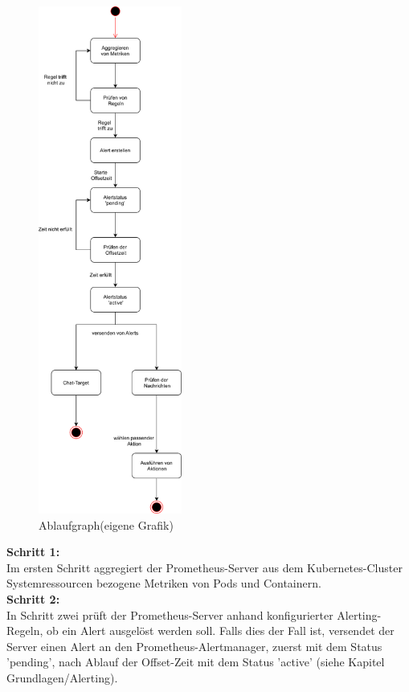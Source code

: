 \documentclass[a4paper,10pt]{scrartcl}
\begin{document}
\pagebreak

\begin{figure}

\begin{center}
  \includegraphics[width=0.42\textwidth,height=1.32\textwidth]{img/AAMtextless.PNG}
  \caption{Ablaufgraph(eigene Grafik)}
\end{center}

\end{figure}
\textbf{Schritt 1:}\\
Im ersten Schritt aggregiert der Prometheus-Server
aus dem Kubernetes-Cluster Systemressourcen bezogene Metriken
von Pods und Containern.\\

\textbf{Schritt 2:}\\
In Schritt zwei prüft der Prometheus-Server anhand konfigurierter Alerting-Regeln,
ob ein Alert ausgelöst werden soll. Falls dies der Fall ist,
versendet der Server einen Alert an den Prometheus-Alertmanager,
 zuerst mit dem Status 'pending',
nach Ablauf der Offset-Zeit mit dem Status 'active' (siehe Kapitel Grundlagen/Alerting).
\end{document}
